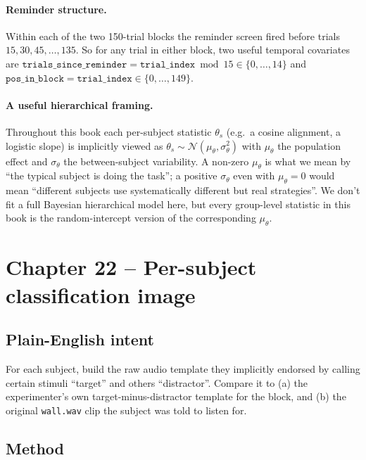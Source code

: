 \documentclass[11pt]{article}
\begin{document}
\paragraph{Reminder structure.}
Within each of the two 150-trial blocks the reminder screen fired before
trials $15, 30, 45, \ldots, 135$. So for any trial in either block, two
useful temporal covariates are
\(\texttt{trials\_since\_reminder} = \texttt{trial\_index} \bmod 15
   \in \{0,\ldots,14\}\)
and
\(\texttt{pos\_in\_block} = \texttt{trial\_index} \in \{0,\ldots,149\}\).

\paragraph{A useful hierarchical framing.}
Throughout this book each per-subject statistic $\theta_s$ (e.g.\ a cosine
alignment, a logistic slope) is implicitly viewed as
\(\theta_s \sim \mathcal{N}(\mu_\theta,\sigma_\theta^2)\) with
\(\mu_\theta\) the population effect and \(\sigma_\theta\) the
between-subject variability. A non-zero $\mu_\theta$ is what we mean by
``the typical subject is doing the task''; a positive $\sigma_\theta$ even
with $\mu_\theta=0$ would mean ``different subjects use systematically
different but real strategies''. We don't fit a full Bayesian hierarchical
model here, but every group-level statistic in this book is the
random-intercept version of the corresponding $\mu_\theta$.

\section{Chapter 22 -- Per-subject classification image}

\subsection{Plain-English intent}

For each subject, build the raw audio template they implicitly endorsed by
calling certain stimuli ``target'' and others ``distractor''. Compare it
to (a) the experimenter's own target-minus-distractor template for the
block, and (b) the original \texttt{wall.wav} clip the subject was told
to listen for.

\subsection{Method}
\end{document}

